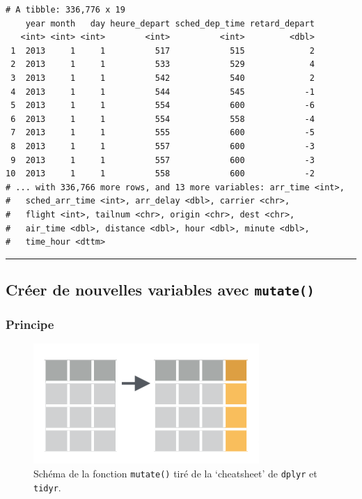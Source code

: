\documentclass[a4paperpaper,]{article}
\begin{document}
\begin{verbatim}
# A tibble: 336,776 x 19
    year month   day heure_depart sched_dep_time retard_depart
   <int> <int> <int>        <int>          <int>         <dbl>
 1  2013     1     1          517            515             2
 2  2013     1     1          533            529             4
 3  2013     1     1          542            540             2
 4  2013     1     1          544            545            -1
 5  2013     1     1          554            600            -6
 6  2013     1     1          554            558            -4
 7  2013     1     1          555            600            -5
 8  2013     1     1          557            600            -3
 9  2013     1     1          557            600            -3
10  2013     1     1          558            600            -2
# ... with 336,766 more rows, and 13 more variables: arr_time <int>,
#   sched_arr_time <int>, arr_delay <dbl>, carrier <chr>,
#   flight <int>, tailnum <chr>, origin <chr>, dest <chr>,
#   air_time <dbl>, distance <dbl>, hour <dbl>, minute <dbl>,
#   time_hour <dttm>
\end{verbatim}

\begin{center}\rule{0.5\linewidth}{\linethickness}\end{center}

\hypertarget{creer-de-nouvelles-variables-avec-mutate}{%
\subsection{\texorpdfstring{Créer de nouvelles variables avec \texttt{mutate()}}{Créer de nouvelles variables avec mutate()}}\label{creer-de-nouvelles-variables-avec-mutate}}

\hypertarget{principe-1}{%
\subsubsection{Principe}\label{principe-1}}

\begin{figure}[htpb]

{\centering \includegraphics[width=0.5\linewidth]{images/mutate} 

}

\caption{Schéma de la fonction \texttt{mutate()} tiré de la `cheatsheet' de \texttt{dplyr} et \texttt{tidyr}.}\label{fig:mutatefig}
\end{figure}
\end{document}
